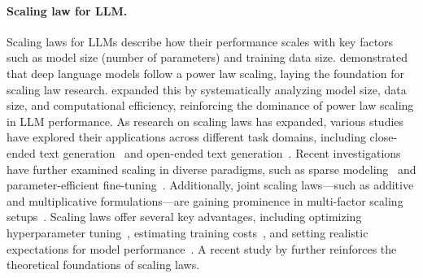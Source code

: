 \paragraph{Scaling law for LLM.}
Scaling laws for LLMs describe how their performance scales with key factors such as model size (number of parameters) and training data size.  
\citet{hestness2017deep} demonstrated that deep language models follow a power law scaling, laying the foundation for scaling law research.
\citet{kaplan2020scaling} expanded this by systematically analyzing model size, data size, and computational efficiency, reinforcing the dominance of power law scaling in LLM performance. 
As research on scaling laws has expanded, various studies have explored their applications across different task domains, including close-ended text generation~\citep{bansal2022data} and open-ended text generation~\citep{kaplan2020scaling}.  
Recent investigations have further examined scaling in diverse paradigms, such as sparse modeling~\citep{frantar2024scaling} and parameter-efficient fine-tuning~\citep{zhang2024when}.  
Additionally, joint scaling laws---such as additive and multiplicative formulations---are gaining prominence in multi-factor scaling setups~\citep{hoffmann2022training, zhang2024when}.  
Scaling laws offer several key advantages, including optimizing hyperparameter tuning~\citep{hendrycksforthcomingintroduction}, estimating training costs~\citep{haegele2024scaling}, and setting realistic expectations for model performance~\citep{hoffmann2022training}. 
A recent study by \citet{bahri2024explaining} further reinforces the theoretical foundations of scaling laws.